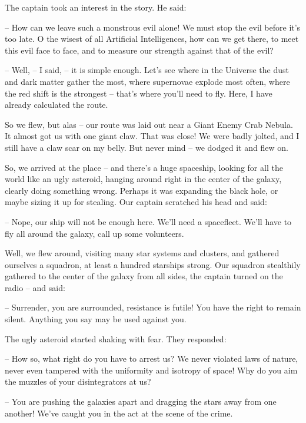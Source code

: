 \documentclass[ebook,oneside,final,openright]{memoir}
\begin{document}
\par
The captain took an interest in the story. He said:\par
– How can we leave such a monstrous evil alone! We must stop the evil before it’s too late. O the wisest of all Artificial Intelligences, how can we get there, to meet this evil face to face, and to measure our strength against that of the evil?\par
– Well, – I said, – it is simple enough. Let’s see where in the Universe the dust and dark matter gather the most, where supernovae explode most often, where the red shift is the strongest – that’s where you’ll need to fly. Here, I have already calculated the route.\par
So we flew, but alas – our route was laid out near a Giant Enemy Crab Nebula. It almost got us with one giant claw. That was close! We were badly jolted, and I still have a claw scar on my belly. But never mind – we dodged it and flew on. \par
\par
So, we arrived at the place – and there’s a huge spaceship, looking for all the world like an ugly asteroid, hanging around right in the center of the galaxy, clearly doing something wrong. Perhaps it was expanding the black hole, or maybe sizing it up for stealing. Our captain scratched his head and said:\par
– Nope, our ship will not be enough here. We’ll need a spacefleet. We’ll have to fly all around the galaxy, call up some volunteers.\par
Well, we flew around, visiting many star systems and clusters, and gathered ourselves a squadron, at least a hundred starships strong. Our squadron stealthily gathered to the center of the galaxy from all sides, the captain turned on the radio – and said:\par
– Surrender, you are surrounded, resistance is futile! You have the right to remain silent. Anything you say may be used against you.\par
The ugly asteroid started shaking with fear. They responded:\par
– How so, what right do you have to arrest us? We never violated laws of nature, never even tampered with the uniformity and isotropy of space! Why do you aim the muzzles of your disintegrators at us?\par
– You are pushing the galaxies apart and dragging the stars away from one another! We’ve caught you in the act at the scene of the crime.\par
\end{document}
